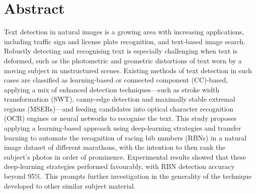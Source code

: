 \chapter*{Abstract}

Text detection in natural images is a growing area with increasing applications, including traffic sign and license plate recognition, and text-based image search.
Robustly detecting and recognising text is especially challenging when text is deformed, such as the photometric and geometric distortions of text worn by a moving subject in unstructured scenes.
Existing methods of text detection in such cases are classified as learning-based or connected component (CC)-based, applying a mix of enhanced detection techniques---such as stroke width transformation (SWT), canny-edge detection and maximally stable extremal regions (MSERs)---and feeding candidates into optical character recognition (OCR) engines or neural networks to recognise the text.
This study proposes applying a learning-based approach using deep-learning strategies and transfer learning to automate the recognition of racing bib numbers (RBNs) in a natural image dataset of different marathons, with the intention to then rank the subject's photos in order of prominence.
Experimental results showed that these deep-learning strategies performed favourably, with RBN detection accuracy beyond 95\%. This prompts further investigation in the generality of the technique developed to other similar subject material.
